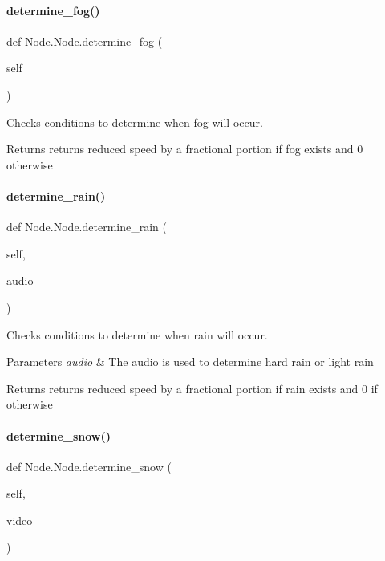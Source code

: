 \paragraph{\texorpdfstring{determine\_fog()}{determine\_fog()}}
{\footnotesize\ttfamily def Node.\+Node.\+determine\+\_\+fog (\begin{DoxyParamCaption}\item[{}]{self }\end{DoxyParamCaption})}



Checks conditions to determine when fog will occur. 

\begin{DoxyReturn}{Returns}
returns reduced speed by a fractional portion if fog exists and 0 otherwise 
\end{DoxyReturn}
\mbox{\label{class_node_1_1_node_ac66862267153afed7cdf5db16fb90eb0}} 
\paragraph{\texorpdfstring{determine\_rain()}{determine\_rain()}}
{\footnotesize\ttfamily def Node.\+Node.\+determine\+\_\+rain (\begin{DoxyParamCaption}\item[{}]{self,  }\item[{}]{audio }\end{DoxyParamCaption})}



Checks conditions to determine when rain will occur. 


\begin{DoxyParams}{Parameters}
{\em audio} & The audio is used to determine hard rain or light rain \\
\hline
\end{DoxyParams}
\begin{DoxyReturn}{Returns}
returns reduced speed by a fractional portion if rain exists and 0 if otherwise 
\end{DoxyReturn}
\mbox{\label{class_node_1_1_node_af1e7e8c1f671e57b873b856a7a104da4}} 
\paragraph{\texorpdfstring{determine\_snow()}{determine\_snow()}}
{\footnotesize\ttfamily def Node.\+Node.\+determine\+\_\+snow (\begin{DoxyParamCaption}\item[{}]{self,  }\item[{}]{video }\end{DoxyParamCaption})}



